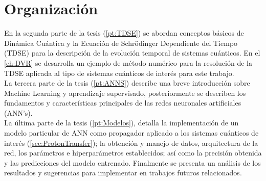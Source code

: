 \section{Organización}

En la segunda parte de la tesis (\autoref{pt:TDSE}) se abordan conceptos básicos de Dinámica Cuántica y la Ecuación de Schrödinger Dependiente del Tiempo (TDSE) para la descripción de la evolución temporal de sistemas cuánticos. En el \autoref{ch:DVR} se desarrolla un ejemplo de método numérico para la resolución de la TDSE aplicada al tipo de sistemas cuánticos de interés para este trabajo.\\

La tercera parte de la tesis (\autoref{pt:ANNS}) describe una breve introducción sobre Machine Learning y aprendizaje supervisado, posteriormente se describen los fundamentos y características principales de las redes neuronales artificiales (ANN's).\\

La última parte de la tesis (\autoref{pt:Modelos}), detalla la implementación de un modelo particular de ANN como propagador aplicado a los sistemas cuánticos de interés (\autoref{sec:ProtonTransfer}); la obtención y manejo de datos, arquitectura de la red, los parámetros e hiperparámetros establecidos; así como la precisión obtenida y las predicciones del modelo entrenado. Finalmente se presenta un análisis de los resultados y sugerencias para implementar en trabajos futuros relacionados.









